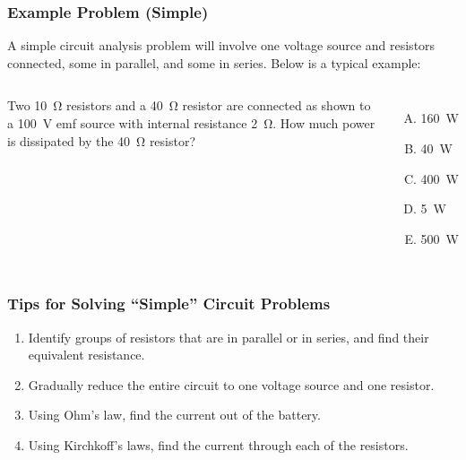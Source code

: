 \documentclass[12pt,aspectratio=169]{beamer}
\begin{document}
\begin{frame}
  \frametitle{Example Problem (Simple)}
  A simple circuit analysis problem will involve one voltage source and
  resistors connected, some in parallel, and some in series. Below is a typical
  example:

  \vspace{.2in}
  \begin{columns}
    Two \SI{10}{\ohm} resistors and a \SI{40}{\ohm} resistor are connected as
    shown to a \SI{100}{\volt} emf source with internal resistance
    \SI{2}{\ohm}. How much power is dissipated by the \SI{40}{\ohm} resistor?
    \begin{enumerate}[(A)]
    \item\SI{160}{\watt}
    \item\SI{40}{\watt}
    \item\SI{400}{\watt}
    \item\SI{5}{\watt}
    \item\SI{500}{\watt}
    \end{enumerate}
  \end{columns}
\end{frame}


\begin{frame}
  \frametitle{Tips for Solving ``Simple'' Circuit Problems}
  \begin{enumerate}
  \item Identify groups of resistors that are in parallel or in series, and
    find their equivalent resistance.
  \item Gradually reduce the entire circuit to one voltage source and one
    resistor.
  \item Using Ohm's law, find the current out of the battery.
  \item Using Kirchkoff's laws, find the current through each of the resistors.
  \end{enumerate}
\end{frame}
\end{document}
